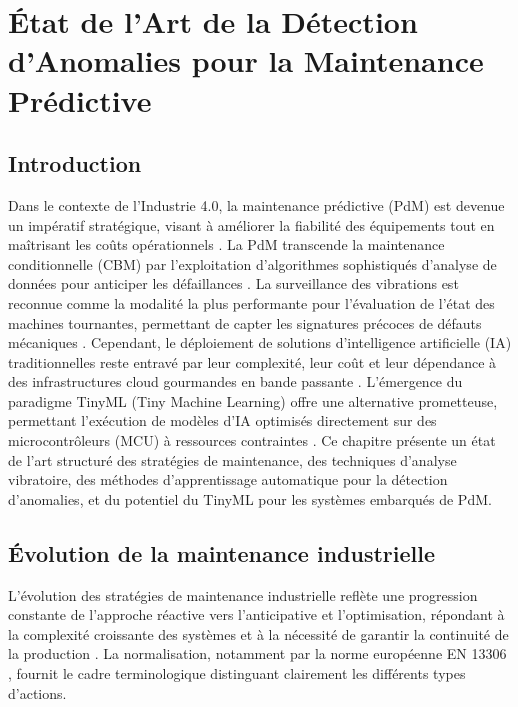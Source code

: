 \chapter{État de l'Art de la Détection d'Anomalies pour la Maintenance Prédictive}
\label{chap:etat_art}
\thispagestyle{plain}

\section{Introduction}

Dans le contexte de l'Industrie 4.0, la maintenance prédictive (PdM) est devenue un impératif stratégique, visant à améliorer la fiabilité des équipements tout en maîtrisant les coûts opérationnels \cite{hector2024,achouch2022}. La PdM transcende la maintenance conditionnelle (CBM) par l'exploitation d'algorithmes sophistiqués d'analyse de données pour anticiper les défaillances \cite{ran2019}. La surveillance des vibrations est reconnue comme la modalité la plus performante pour l'évaluation de l'état des machines tournantes, permettant de capter les signatures précoces de défauts mécaniques \cite{tiboni2022,hassan2024}. Cependant, le déploiement de solutions d'intelligence artificielle (IA) traditionnelles reste entravé par leur complexité, leur coût et leur dépendance à des infrastructures cloud gourmandes en bande passante \cite{njor2024}. L'émergence du paradigme TinyML (Tiny Machine Learning) offre une alternative prometteuse, permettant l'exécution de modèles d'IA optimisés directement sur des microcontrôleurs (MCU) à ressources contraintes \cite{tsoukas2024}. Ce chapitre présente un état de l'art structuré des stratégies de maintenance, des techniques d'analyse vibratoire, des méthodes d'apprentissage automatique pour la détection d'anomalies, et du potentiel du TinyML pour les systèmes embarqués de PdM.

\section{Évolution de la maintenance industrielle}

L'évolution des stratégies de maintenance industrielle reflète une progression constante de l'approche réactive vers l'anticipative et l'optimisation, répondant à la complexité croissante des systèmes et à la nécessité de garantir la continuité de la production \cite{ran2019}. La normalisation, notamment par la norme européenne EN 13306 \cite{en13306}, fournit le cadre terminologique distinguant clairement les différents types d'actions.

